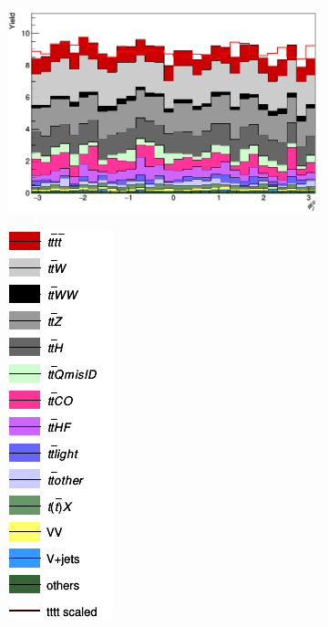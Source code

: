 \begin{figure}[H]
\begin{subfigure}{.5\textwidth}
  \centering
  \includegraphics[width=.99\linewidth]{figs/featuresRNN/jet_phi_0}
\end{subfigure}
\begin{subfigure}{.5\textwidth}
  \centering
  \includegraphics[width=.29\linewidth]{figs/featuresRNN/Legend_wo}
\end{subfigure}
\begin{subfigure}{.5\textwidth}

\end{subfigure}
\end{figure}
